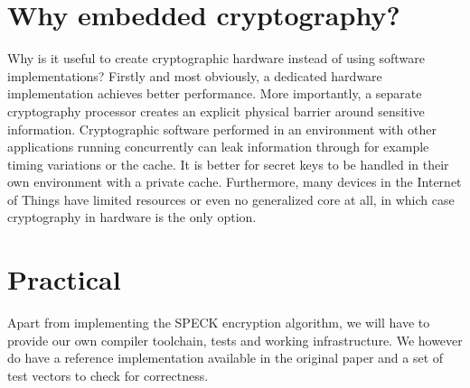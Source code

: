\documentclass[letterpaper]{article}
\begin{document}
\section{Why embedded cryptography?}
Why is it useful to create cryptographic hardware instead of using software implementations? Firstly and most obviously, a dedicated hardware implementation achieves better performance. More importantly, a separate cryptography processor creates an explicit physical barrier around sensitive information. Cryptographic software performed in an environment with other applications running concurrently can leak information through for example timing variations or the cache. It is better for secret keys to be handled in their own environment with a private cache. Furthermore, many devices in the Internet of Things have limited resources or even no generalized core at all, in which case cryptography in hardware is the only option. 


\section{Practical}
Apart from implementing the SPECK encryption algorithm, we will have to provide our own compiler toolchain, tests and working infrastructure. We however do have a reference implementation available in the original paper \cite{speck} and a set of test vectors to check for correctness. 


\footnotesize




 
\end{document}
